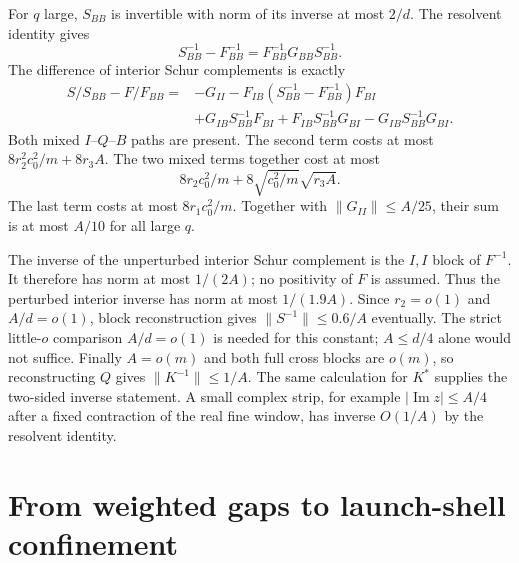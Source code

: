 For $q$ large, $S_{BB}$ is invertible with norm of its inverse at
most $2/d$. The resolvent identity gives
\[
 S_{BB}^{-1}-F_{BB}^{-1}=F_{BB}^{-1}G_{BB}S_{BB}^{-1}.
\]
The difference of interior Schur complements is exactly
\begin{equation}\label{eq:libSchurdifference}
\begin{split}
 S/S_{BB}-F/F_{BB}={}&-G_{II}
 -F_{IB}(S_{BB}^{-1}-F_{BB}^{-1})F_{BI}\\
 &+G_{IB}S_{BB}^{-1}F_{BI}
   +F_{IB}S_{BB}^{-1}G_{BI}
   -G_{IB}S_{BB}^{-1}G_{BI}.
\end{split}
\end{equation}
Both mixed $I$--$Q$--$B$ paths are present.
The second term costs at most
$8r_2^2c_0^2/m+8r_3A$.
The two mixed terms together cost at most
\[
 8r_2c_0^2/m+
 8\sqrt{c_0^2/m}\sqrt{r_3A}.
\]
The last term costs at most $8r_1c_0^2/m$.
Together with $\|G_{II}\|\le A/25$, their sum is at most $A/10$
for all large $q$.

The inverse of the unperturbed interior Schur complement is the
$I,I$ block of $F^{-1}$. It therefore has norm at most $1/(2A)$;
no positivity of $F$ is assumed. Thus the perturbed interior inverse
has norm at most $1/(1.9A)$.
Since $r_2=o(1)$ and $A/d=o(1)$, block reconstruction gives
$\|S^{-1}\|\le0.6/A$ eventually. The strict little-$o$ comparison
$A/d=o(1)$ is needed for this constant; $A\le d/4$ alone would not
suffice. Finally $A=o(m)$ and both full cross blocks are $o(m)$,
so reconstructing $Q$ gives $\|K^{-1}\|\le1/A$.
The same calculation for $K^*$ supplies the two-sided inverse
statement. A small complex strip, for example
$|\operatorname{Im}z|\le A/4$ after a fixed contraction of the real
fine window, has inverse $O(1/A)$ by the resolvent identity.

\section{From weighted gaps to launch-shell confinement}
\label{app:liblocal}

